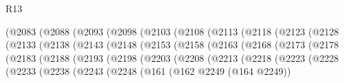 \begin{lexlean}{R13}
\begin{coremodule}
{{{{{{{{{{{{{{{{{{{{{{{{{{{{{{{{{{{{{{{{{{{{{{{{{{{{{{{{{{{{{{{{{{{{{{{{{{{{{{{{{{{{{{{{{{{{{{{{{{{{{{{{{{                      (@2083
                        (@2088
                          (@2093
                            (@2098
                              (@2103
                                (@2108
                                  (@2113
                                    (@2118
                                      (@2123
                                        (@2128
                                          (@2133
                                            (@2138
                                              (@2143
                                                (@2148
                                                  (@2153
                                                    (@2158
                                                      (@2163
                                                        (@2168
                                                          (@2173
                                                            (@2178
                                                              (@2183
                                                                (@2188
                                                                  (@2193
                                                                    (@2198
                                                                      (@2203
                                                                        (@2208
                                                                          (@2213
                                                                            (@2218
                                                                              (@2223
                                                                                (@2228
                                                                                  (@2233
                                                                                    (@2238
                                                                                      (@2243
                                                                                        (@2248
                                                                                          (@161
                                                                                            (@162
                                                                                              @2249
                                                                                              (@164
                                                                                                @2249))
}}}}}}}}}}}}}}}}}}}}}}}}}}}}}}}}}}}}}}}}}}}}}}}}}}}}}}}}}}}}}}}}}}}}}}}}}}}}}}}}}}}}}}}}}}}}}}}}}}}}}}}}}}
\end{coremodule}
\end{lexlean}
